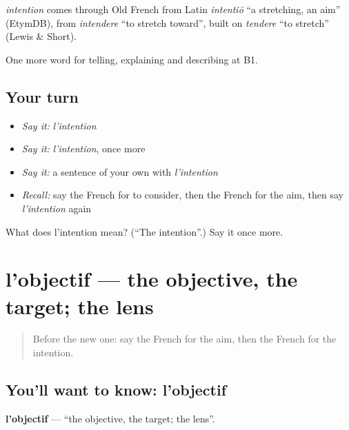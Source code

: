 \begin{cousinweb}
\emph{intention} comes through Old French from Latin \emph{intentiō} \textquotedblleft{}a stretching, an aim\textquotedblright{} (EtymDB), from \emph{intendere} \textquotedblleft{}to stretch toward\textquotedblright{}, built on \emph{tendere} \textquotedblleft{}to stretch\textquotedblright{} (Lewis \& Short).
\end{cousinweb}

\begin{grammarlens}[title={What you've built}]
One more word for telling, explaining and describing at B1.
\end{grammarlens}

\subsection*{Your turn}
\begin{itemize}
\raggedright
  \item \emph{Say it:} \emph{l'intention}
  \item \emph{Say it:} \emph{l'intention}, once more
  \item \emph{Say it:} a sentence of your own with \emph{l'intention}
  \item \emph{Recall:} say the French for to consider, then the French for the aim, then say \emph{l'intention} again
\end{itemize}

\begin{tcolorbox}[breakable,colback=teal!4,colframe=teal!35!black,title={Before you move on}]
What does l'intention mean? (\textquotedblleft{}The intention\textquotedblright{}.) Say it once more.
\end{tcolorbox}
\section[l'objectif]{l'objectif — the objective, the target; the lens}

\label{lesson:FR-C374-objectif}



\begin{quote}
Before the new one: say the French for the aim, then the French for the intention.
\end{quote}

\subsection*{You'll want to know: l'objectif}
\textbf{l'objectif} — \textquotedblleft{}the objective, the target; the lens\textquotedblright{}.

